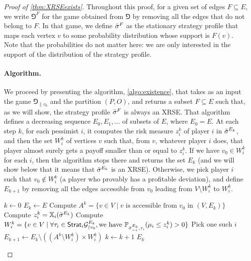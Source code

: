 \XRSEexists*

\begin{proof}[Proof of \cref{thm:XRSEexists}]
    Throughout this proof, for a given set of edges $F \subseteq E$, we write $\Game^F$ for the game obtained from $\Game$ by removing all the edges that do not belong to $F$.
    In that game, we define ${\bar{\sigma}}^F$ as the stationary strategy profile that maps each vertex $v$ to some probability distribution whose support is $F(v)$.
    Note that the probabilities do not matter here: we are only interested in the support of the distribution of the strategy profile.

    \paragraph*{Algorithm.} We proceed by presenting the algorithm, \cref{algo:existence}, that takes as an input the game $\Game_{\|v_0}$ and the partition $(P, O)$, and returns a subset $F \subseteq E$ such that, as we will show, the strategy profile ${\bar{\sigma}}^F$ is always an XRSE.
    That algorithm defines a decreasing sequence $E_0, E_1, \dots$ of subsets of $E$, where $E_0 = E$.
    At each step $k$, for each pessimist $i$, it computes the risk measure $z_i^k$ of player $i$ in ${\bar{\sigma}}^{E_k}$, and then the set $W_i^k$ of vertices $v$ such that, from $v$, whatever player $i$ does, that player almost surely gets a payoff smaller than or equal to $z_i^k$.
    If we have $v_0 \in W_i^k$ for each $i$, then the algorithm stops there and returns the set $E_k$ (and we will show below that it means that ${\bar{\sigma}}^{E_k}$ is an XRSE).
    Otherwise, we pick player $i$ such that $v_0 \not\in W_i^k$ (a player who provably has a profitable deviation), and define $E_{k+1}$ by removing all the edges accessible from $v_0$ leading from $V \setminus W_i^k$ to $W_i^k$.


            \begin{algorithm}
            \begin{algorithmic}\caption{Exhibition of one stationary XRSE}\label{algo:existence}
                    \State $k \gets 0$
                    \State $E_k \gets E$
                    \While{$\top$}
                        \State Compute $A^k = \{v \in V \mid v \text{ is accessible from } v_0 \text{ in } (V, E_k)\}$
                            \State Compute $z^k_i = \mathbb{X}_i({\bar{\sigma}}^{E_k})$
                            \State Compute $W^k_i = \{v \in V \mid \forall \tau_i \in \mathsf{Strat}_i \mathcal{G}^{E_k}_{\upharpoonright v_0}, \text{we have } \mathbb{P}_{{\bar{\sigma}}^{E_k}_{-i}, \tau_i}(\mu_i \leq z^k_i) > 0\}$
                        \EndFor
                            \State Pick one such $i$
                            \State $E_{k+1} \gets E_k \setminus ((A^k \setminus W_i^k) \times W_i^k)$
                            \State $k \gets k+1$
                        \Else
                            \State \Return $E_k$
                        \EndIf
                    \EndWhile
                \EndProcedure
            \end{algorithmic}
        \end{algorithm}


\end{proof}
